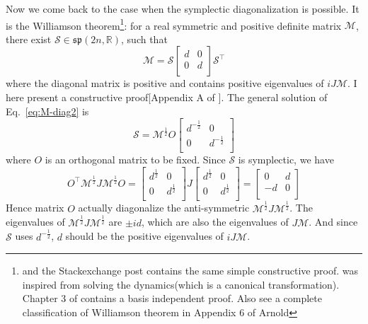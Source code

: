 Now we come back to the case when the symplectic diagonalization is possible. It is the Williamson theorem\footnote{\cite{simon_congruences_1999,pirandola_correlation_2009} and the Stackexchange post \cite{_linear_stexg} contains the same simple constructive proof. \cite{xiao_theory_2009} was inspired from solving the dynamics(which is a canonical transformation). Chapter 3 of \cite{gosson_symplectic_2006} contains a basis independent proof. Also see a complete classification of Williamson theorem in Appendix 6 of Arnold\cite{arnold_mathematical_1997}}: for a real symmetric and positive definite matrix $\mathcal{M}$, there exist $\mathcal{S} \in \mathfrak{sp}( 2n, \mathbb{R} )$, such that
\begin{equation}
\label{eq:M-diag2}
\mathcal{M}  = \mathcal{S}
\begin{bmatrix}
d & 0 \\
0 & d \\
\end{bmatrix} \mathcal{S}^{\top}
\end{equation}
where the diagonal matrix is positive and contains positive eigenvalues of $i J\mathcal{M}$. I here present a constructive proof[Appendix A of \cite{pirandola_correlation_2009}]. The general solution of Eq.~\eqref{eq:M-diag2} is 
\begin{equation}
 \mathcal{S} = \mathcal{M}^{\frac{1}{2}} O 
\begin{bmatrix}
d^{-\frac{1}{2}} & 0 \\
0 & d^{-\frac{1}{2}}\\
\end{bmatrix}
\end{equation}
where $O$ is an orthogonal matrix to be fixed. Since $\mathcal{S}$ is symplectic, we have
\begin{equation}
O^{\top} \mathcal{M}^{\frac{1}{2}} J \mathcal{M}^{\frac{1}{2}} O  = 
\begin{bmatrix}
d^{\frac{1}{2}} & 0 \\
0 & d^{\frac{1}{2}} \\
\end{bmatrix}
J
\begin{bmatrix}
d^{\frac{1}{2}} & 0 \\
0 & d^{\frac{1}{2}} \\
\end{bmatrix}
=
\begin{bmatrix}
0 & d\\
-d & 0 \\
\end{bmatrix}
\end{equation}
Hence matrix $O$ actually diagonalize the anti-symmetric $ \mathcal{M}^{\frac{1}{2}} J \mathcal{M}^{\frac{1}{2}}$. The eigenvalues of $ \mathcal{M}^{\frac{1}{2}} J \mathcal{M}^{\frac{1}{2}}$ are $\pm i d$, which are also the eigenvalues of $  J \mathcal{M}$. And since $\mathcal{S}$ uses $d^{-\frac{1}{2}}$, $d$ should be the positive eigenvalues of  $iJ \mathcal{M}$. 



